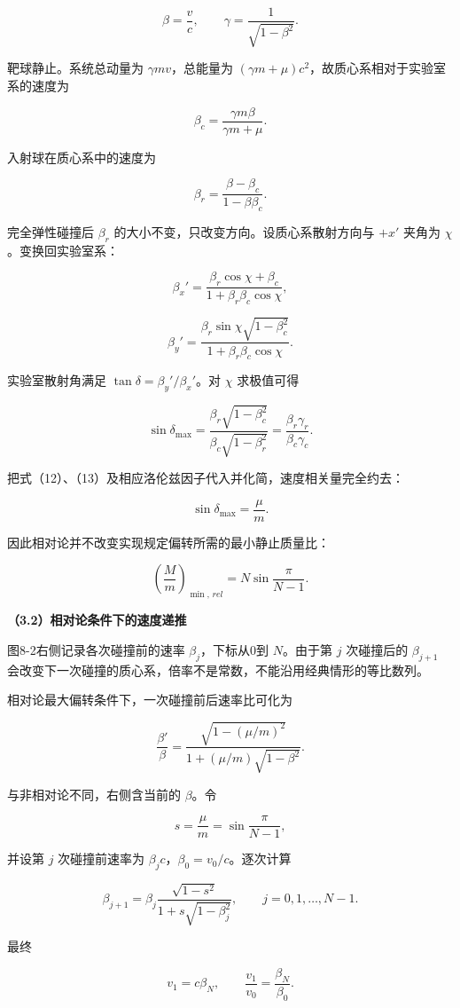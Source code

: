 \documentclass[12pt,a4paper,UTF8]{ctexart}
\begin{document}
\[\beta=\frac vc,\qquad \gamma=\frac1{\sqrt{1-\beta^2}}.\]

靶球静止。系统总动量为 \(\gamma mv\)，总能量为
\((\gamma m+\mu)c^2\)，故质心系相对于实验室系的速度为

\[\boxed{\beta_c=\frac{\gamma m\beta}{\gamma m+\mu}}.\]

入射球在质心系中的速度为

\[\beta_r=\frac{\beta-\beta_c}{1-\beta\beta_c}.\]

完全弹性碰撞后 \(\beta_r\) 的大小不变，只改变方向。设质心系散射方向与
\(+x'\) 夹角为 \(\chi\)。变换回实验室系：

\[\beta_x'=
\frac{\beta_r\cos\chi+\beta_c}
{1+\beta_r\beta_c\cos\chi},\]

\[\beta_y'=
\frac{\beta_r\sin\chi\sqrt{1-\beta_c^2}}
{1+\beta_r\beta_c\cos\chi}.\]

实验室散射角满足 \(\tan\delta=\beta_y'/\beta_x'\)。对 \(\chi\)
求极值可得

\[\sin\delta_{\max}
=\frac{\beta_r\sqrt{1-\beta_c^2}}
{\beta_c\sqrt{1-\beta_r^2}}
=\frac{\beta_r\gamma_r}{\beta_c\gamma_c}.\]

把式（12）、（13）及相应洛伦兹因子代入并化简，速度相关量完全约去：

\[\boxed{\sin\delta_{\max}=\frac\mu m}.\]

因此相对论并不改变实现规定偏转所需的最小静止质量比：

\[\boxed{
\left(\frac Mm\right)_{\min,\,rel}
=N\sin\frac{\pi}{N-1}}.\]

\textbf{（3.2）相对论条件下的速度递推}

图8-2右侧记录各次碰撞前的速率 \(\beta_j\)，下标从0到 \(N\)。由于第 \(j\)
次碰撞后的 \(\beta_{j+1}\)
会改变下一次碰撞的质心系，倍率不是常数，不能沿用经典情形的等比数列。

相对论最大偏转条件下，一次碰撞前后速率比可化为

\[\boxed{
\frac{\beta'}{\beta}
=\frac{\sqrt{1-(\mu/m)^2}}
{1+(\mu/m)\sqrt{1-\beta^2}}}.\]

与非相对论不同，右侧含当前的 \(\beta\)。令

\[s=\frac\mu m=\sin\frac{\pi}{N-1},\]

并设第 \(j\) 次碰撞前速率为 \(\beta_jc\)，\(\beta_0=v_0/c\)。逐次计算

\[\boxed{
\beta_{j+1}
=\beta_j\frac{\sqrt{1-s^2}}
{1+s\sqrt{1-\beta_j^2}},
\qquad j=0,1,\ldots,N-1}.\]

最终

\[\boxed{v_1=c\beta_N},\qquad
\boxed{\frac{v_1}{v_0}=\frac{\beta_N}{\beta_0}}.\]
\end{document}
